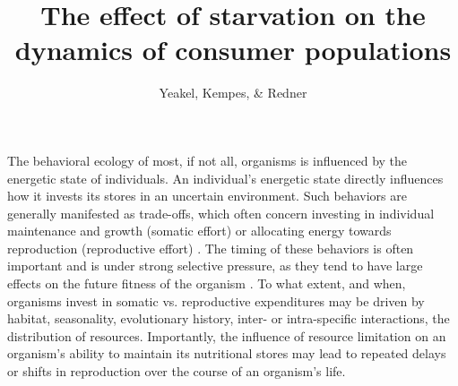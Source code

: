 \documentclass[12pt,english]{article}
\begin{document}
\begin{spacing}{1.9}


\title{The effect of starvation on the dynamics of consumer populations}
\author{Yeakel, Kempes, \& Redner}
\maketitle

\linenumbers



The behavioral ecology of most, if not all, organisms is influenced by the energetic state of individuals.
An individual's energetic state directly influences how it invests its stores in an uncertain environment.
Such behaviors are generally manifested as trade-offs, which often concern investing in individual maintenance and growth (somatic effort) or allocating energy towards reproduction (reproductive effort) \citep{Martin:1987dl,Kirk:1997cc,Kempes:2012hy}. %
The timing of these behaviors is often important and is under strong selective pressure, as they tend to have large effects on the future fitness of the organism \citep{Mangel:1988uaa}.
To what extent, and when, organisms invest in somatic vs. reproductive expenditures may be driven by habitat, seasonality, evolutionary history, inter- or intra-specific interactions, the distribution of resources.
Importantly, the influence of resource limitation on an organism's ability to maintain its nutritional stores may lead to repeated delays or shifts in reproduction over the course of an organism's life. %


\end{spacing}
\end{document}

